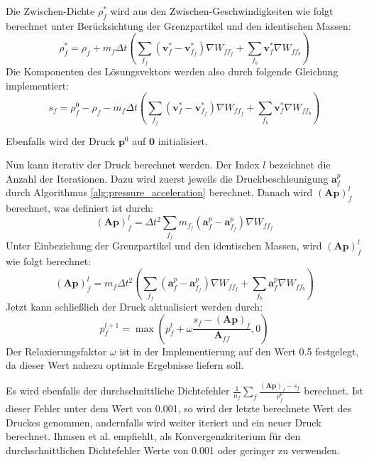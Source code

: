 \documentclass{scrreprt}
\begin{document}
Die Zwischen-Dichte $\rho_f^*$ wird aus den Zwischen-Geschwindigkeiten wie folgt berechnet unter Berücksichtung der Grenzpartikel und den identischen Massen:
\begin{equation}
    \rho_f^* = \rho_f + m_f \Delta t \left(\sum_{f_f}(\textbf{v}_f^* - \textbf{v}_{f_f}^*) \nabla W_{ff_f} + \sum_{f_b}\textbf{v}_f^* \nabla W_{ff_b}\right)
\end{equation}
Die Komponenten des Lösungsvektors werden also durch folgende Gleichung implementiert:
\begin{equation}
    s_f = \rho_f^0 - \rho_f - m_f \Delta t \left(\sum_{f_f}(\textbf{v}_f^* - \textbf{v}_{f_f}^*) \nabla W_{ff_f} + \sum_{f_b}\textbf{v}_f^* \nabla W_{ff_b}\right)
\end{equation}

Ebenfalls wird der Druck $\textbf{p}^0$ auf $\textbf{0}$ initialisiert.

Nun kann iterativ der Druck berechnet werden.
Der Index $l$ bezeichnet die Anzahl der Iterationen.
Dazu wird zuerst jeweils die Druckbeschleunigung $\textbf{a}_f^p$ durch Algorithmus \ref{alg:pressure_acceleration} berechnet.
Danach wird $(\textbf{A}\textbf{p})_f^l$ berechnet, was definiert ist durch:
\begin{equation}
    (\textbf{A}\textbf{p})_f^l = \Delta t^2 \sum_{f_f} m_{f_f} (\textbf{a}_f^p - \textbf{a}_{f_f}^p) \nabla W_{ff_f}
\end{equation}
Unter Einbeziehung der Grenzpartikel und den identischen Massen, wird $(\textbf{A}\textbf{p})_f^l$ wie folgt berechnet:
\begin{equation}
    (\textbf{A}\textbf{p})_f^l = m_f \Delta t^2\left(\sum_{f_f}(\textbf{a}_f^p - \textbf{a}_{f_f}^p) \nabla W_{ff_f} + \sum_{f_b}\textbf{a}_f^p \nabla W_{ff_b}\right)
\end{equation}
Jetzt kann schließlich der Druck aktualisiert werden durch:
\begin{equation}
    p_f^{l+1} = \max(p_f^l + \omega \frac{s_f - (\textbf{A}\textbf{p})_f}{\textbf{A}_{ff}}, 0)
\end{equation}
Der Relaxierungsfaktor $\omega$ ist in der Implementierung auf den Wert 0.5 festgelegt,
da dieser Wert nahezu optimale Ergebnisse liefern soll. \cite{ihmsen_implicit_2014}

Es wird ebenfalls der durchschnittliche Dichtefehler $\frac{1}{n_f} \sum_{f} \frac{(\textbf{A}\textbf{p})_f - s_f}{\rho_f^0}$ berechnet.
Ist dieser Fehler unter dem Wert von 0.001, so wird der letzte berechnete Wert des Druckes genommen, andernfalls wird weiter iteriert und ein neuer Druck berechnet.
Ihmsen et al. \cite{ihmsen_implicit_2014} empfiehlt, als Konvergenzkriterium für den durchschnittlichen Dichtefehler Werte von 0.001 oder geringer zu verwenden.
\end{document}
